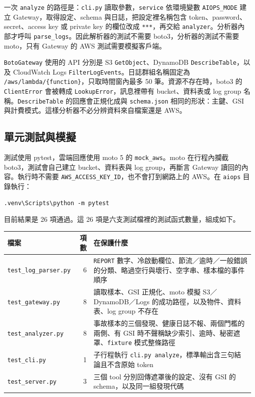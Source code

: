 \documentclass[11pt]{article}
\begin{document}
一次 \texttt{analyze} 的路徑是：\texttt{cli.py} 讀取參數，\texttt{service} 依環境變數 \texttt{AIOPS\_MODE} 建立 Gateway，取得設定、schema 與日誌，把設定裡名稱包含 token、password、secret、access key 或 private key 的欄位改成 \texttt{***}，再交給 \texttt{analyzer}。分析器內部才呼叫 \texttt{parse\_logs}。因此解析器的測試不需要 boto3，分析器的測試不需要 moto，只有 Gateway 的 AWS 測試需要模擬客戶端。

\texttt{BotoGateway} 使用的 API 分別是 S3 \texttt{GetObject}、DynamoDB \texttt{DescribeTable}，以及 CloudWatch Logs \texttt{FilterLogEvents}。日誌群組名稱固定為 \texttt{/aws/lambda/\{function\}}，只取時間窗內最多 50 筆。資源不存在時，boto3 的 \texttt{ClientError} 會被轉成 \texttt{LookupError}，訊息裡帶有 bucket、資料表或 log group 名稱。\texttt{DescribeTable} 的回應會正規化成與 \texttt{schema.json} 相同的形狀：主鍵、GSI 與計費模式。這樣分析器不必分辨資料來自檔案還是 AWS。

\subsection{單元測試與模擬}

測試使用 pytest，雲端回應使用 moto 5 的 \texttt{mock\_aws}。moto 在行程內攔截 boto3，測試會自己建立 bucket、資料表與 log group，再斷言 Gateway 讀回的內容。執行時不需要 \texttt{AWS\_ACCESS\_KEY\_ID}，也不會打到網路上的 AWS。在 \texttt{aiops} 目錄執行：

\begin{verbatim}
.venv\Scripts\python -m pytest
\end{verbatim}

目前結果是 26 項通過。這 26 項是六支測試檔裡的測試函式數量，組成如下。

\begin{center}
\begin{tabular}{lrp{7.4cm}}
\toprule
檔案 & 項數 & 在保護什麼 \\
\midrule
\texttt{test\_log\_parser.py} & 6 & \texttt{REPORT} 數字、冷啟動欄位、節流／逾時／一般錯誤的分類、略過空行與壞行、空字串、樣本檔的事件順序 \\
\texttt{test\_gateway.py} & 8 & 讀取樣本、GSI 正規化、moto 模擬 S3／DynamoDB／Logs 的成功路徑，以及物件、資料表、log group 不存在 \\
\texttt{test\_analyzer.py} & 8 & 事故樣本的三個發現、健康日誌不報、兩個門檻的兩側、有 GSI 時不聲稱缺少索引、逾時、秘密遮罩、\texttt{fixture} 模式整條路徑 \\
\texttt{test\_cli.py} & 1 & 子行程執行 \texttt{cli.py analyze}，標準輸出含三句結論且不含原始 token \\
\texttt{test\_server.py} & 3 & 三個 tool 分別回傳遮罩後的設定、沒有 GSI 的 schema，以及同一組發現代碼 \\
\bottomrule
\end{tabular}
\end{center}
\end{document}
